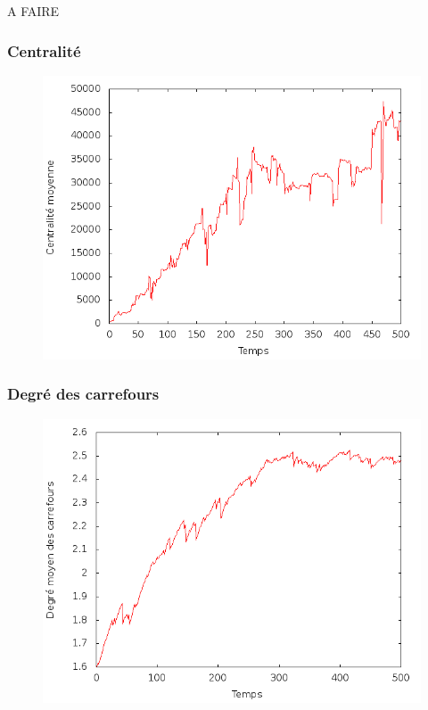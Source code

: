 \documentclass[12pt]{article}
\begin{document}
A FAIRE

\begin{figure}[H]
  \centering
  \caption{}
\end{figure}


\subsubsection{Centralité}

\begin{figure}[H]
  \centering
  \includegraphics[width=.8\linewidth]{images/centrality.png}
  \caption{}
\end{figure}

\subsubsection{Degré des carrefours}

\begin{figure}[H]
  \centering
  \includegraphics[width=.8\linewidth]{images/degree.png}
  \caption{}
\end{figure}
\end{document}
